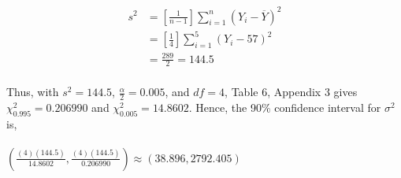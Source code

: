 \documentclass[12pt]{article}
\newenvironment{problem}[2][Problem]{\begin{trivlist}
\item[\hskip \labelsep {\bfseries #1}\hskip \labelsep {\bfseries #2.}]}{\end{trivlist}}
\begin{document}
\begin{problem}{8.102}

\end{problem}
\begin{align*}
		 s^2 &= [\frac{1}{n-1}]\sum\limits_{i=1}^{n} (Y_i - \overline{Y})^2\\
		 &= [\frac{1}{4}]\sum\limits_{i=1}^{5} (Y_i - 57)^2\\
		 &= \frac{289}{2} = 144.5
\end{align*}\\

Thus, with $s^2 = 144.5$, $\frac{\alpha}{2} = 0.005$, and $df = 4$, Table 6, Appendix 3 gives $\chi^2_{0.995} = 0.206990$ and $\chi^2_{0.005} = 14.8602$. Hence, the 90\% confidence interval for $\sigma^2$ is,\\
\\
$(\frac{(4)(144.5)}{14.8602}, \frac{(4)(144.5)}{0.206990}) \approx (38.896, 2792.405)$
\end{document}
